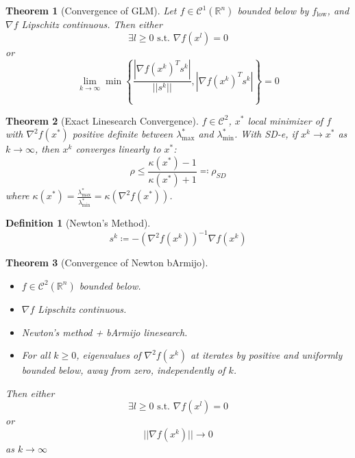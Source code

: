 \documentclass[a4paper]{article}
\newcommand{\R}{\mathbb{R}}
\newcommand{\C}{\mathcal{C}}
\newcommand{\st}{\text{ s.t. }}
\newcommand{\norm}[1]{\lvert \lvert #1 \rvert \rvert}
\newtheorem{theorem}{Theorem}
\newtheorem*{definition*}{Definition}
\begin{document}
\setcounter{theorem}{3}
\begin{theorem}[Convergence of GLM]
    Let $f \in \C^1 \left( \R^n \right)$ bounded below by $f_{\text{low}}$,
    and $\nabla f$ Lipschitz continuous.
    Then either
    \begin{equation*}
        \exists l \geq 0 \st \nabla f \left( x^l \right) = 0
    \end{equation*}
    or
    \begin{equation*}
        \lim_{k \rightarrow \infty} \min \left\{ \frac{|\nabla f \left( x^k \right)^T s^k|}{\norm{s^k}}, |\nabla f \left( x^k \right)^T s^k| \right\} = 0
    \end{equation*}
\end{theorem}

\setcounter{theorem}{5}
\begin{theorem}[Exact Linesearch Convergence]
    $f \in \C^2$, $x^*$ local minimizer of $f$ with $\nabla^2 f\left( x^* \right)$ positive definite between $\lambda_{\max}^*$ and $\lambda_{\min}^{*}$.
    With SD-e, if $x^k \rightarrow x^*$ as $k \rightarrow \infty$, then $x^k$ converges linearly to $x^*$:
    \begin{equation*}
        \rho \leq \frac{\kappa \left( x^* \right) - 1}{\kappa \left( x^* \right) + 1} \eqqcolon \rho_{SD}
    \end{equation*}
    where $\kappa\left( x^* \right) = \frac{\lambda_{\max}^*}{\lambda_{\min}^*} = \kappa \left( \nabla^2 f\left( x^* \right) \right)$.
\end{theorem}

\begin{definition*}[Newton's Method]
    \begin{equation*}
        s^k \coloneqq - \left( \nabla^2 f \left( x^k \right) \right)^{-1} \nabla f \left( x^k \right)
    \end{equation*}
\end{definition*}

\setcounter{theorem}{8}
\begin{theorem}[Convergence of Newton bArmijo]
    \begin{itemize}
        \item $f \in \C^2 \left( \R^n \right)$ bounded below.
        \item $\nabla f$ Lipschitz continuous.
        \item Newton's method + bArmijo linesearch.
        \item For all $k \geq 0$, eigenvalues of $\nabla^2 f\left( x^k \right)$ at iterates by positive and uniformly bounded below, away from zero, independently of $k$.
    \end{itemize}
    Then either
    \begin{equation*}
        \exists l \geq 0 \st \nabla f \left( x^l \right) = 0
    \end{equation*}
    or
    \begin{equation*}
        \norm{\nabla f \left( x^k \right)} \rightarrow 0
    \end{equation*}
    as $k \rightarrow \infty$
\end{theorem}
\end{document}

